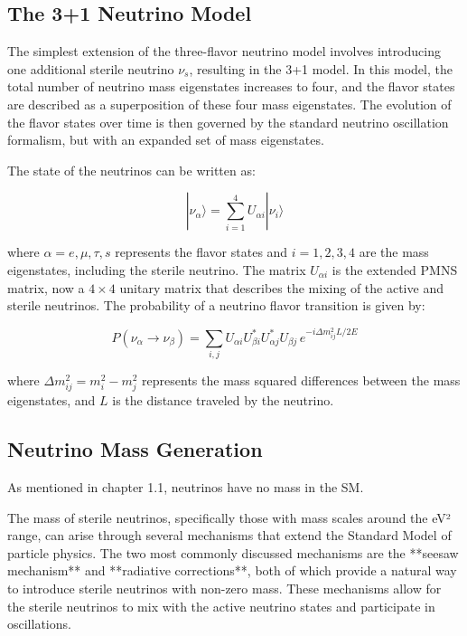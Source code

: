 \documentclass[a4paper,12pt,numbered]{article}
\begin{document}
\subsection{The 3+1 Neutrino Model}

The simplest extension of the three-flavor neutrino model involves introducing one additional sterile neutrino \( \nu_s \), resulting in the 3+1 model. In this model, the total number of neutrino mass eigenstates increases to four, and the flavor states are described as a superposition of these four mass eigenstates. The evolution of the flavor states over time is then governed by the standard neutrino oscillation formalism, but with an expanded set of mass eigenstates.

The state of the neutrinos can be written as:

\[
|\nu_\alpha\rangle = \sum_{i=1}^{4} U_{\alpha i} |\nu_i\rangle
\]

where \( \alpha = e, \mu, \tau, s \) represents the flavor states and \( i = 1, 2, 3, 4 \) are the mass eigenstates, including the sterile neutrino. The matrix \( U_{\alpha i} \) is the extended PMNS matrix, now a \( 4 \times 4 \) unitary matrix that describes the mixing of the active and sterile neutrinos. The probability of a neutrino flavor transition is given by:

\[
P(\nu_\alpha \to \nu_\beta) = \sum_{i,j} U_{\alpha i} U_{\beta i}^* U_{\alpha j}^* U_{\beta j} \, e^{-i \Delta m^2_{ij} L / 2E}
\]

where \( \Delta m^2_{ij} = m_i^2 - m_j^2 \) represents the mass squared differences between the mass eigenstates, and \( L \) is the distance traveled by the neutrino.

\subsection{Neutrino Mass Generation}

As mentioned in chapter 1.1, neutrinos have no mass in the SM. 

The mass of sterile neutrinos, specifically those with mass scales around the eV² range, can arise through several mechanisms that extend the Standard Model of particle physics. The two most commonly discussed mechanisms are the **seesaw mechanism** and **radiative corrections**, both of which provide a natural way to introduce sterile neutrinos with non-zero mass. These mechanisms allow for the sterile neutrinos to mix with the active neutrino states and participate in oscillations.
\end{document}
